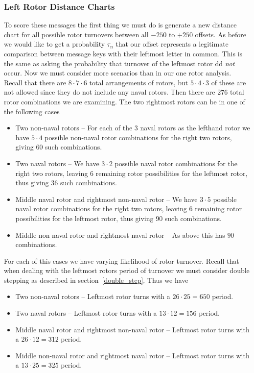   \subsubsection{Left Rotor Distance Charts}
  To score these messages the first thing we must do is generate a
  new distance chart for all possible rotor turnovers between all
  $-250$ to $+250$ offsets. As before we would like to get a
  probability $\tau_n$ that our offset represents a legitimate
  comparison between message keys with their leftmost letter in
  common. This is the same as asking the probability that turnover of
  the leftmost rotor dd \emph{not} occur. Now we must consider
  more scenarios than in our one rotor analysis. Recall that there
  are $8\cdot7\cdot6$ total arrangements of rotors, but
  $5\cdot4\cdot3$ of these are not allowed since they do not include
  any naval rotors. Then there are $276$ total rotor combinations we
  are examining. The two rightmost rotors can be in one of the following cases
  \begin{itemize}
    \item Two non-naval rotors -- For each of the $3$ naval rotors as
      the lefthand rotor we have $5\cdot4$ possible non-naval rotor
      combinations for the right two rotors, giving $60$ such combinations.
    \item Two naval rotors --  We have $3\cdot2$ possible naval rotor
      combinations for the right two rotors, leaving $6$ remaining
      rotor possibilities for the leftmost rotor, thus giving $36$
      such combinations.
    \item Middle naval rotor and rightmost non-naval rotor --  We
      have $3\cdot5$ possible naval rotor combinations for the right
      two rotors, leaving $6$ remaining rotor possibilities for the
      leftmost rotor, thus giving $90$ such combinations.
    \item Middle non-naval rotor and rightmost naval rotor --  As
      above this has $90$ combinations.
  \end{itemize}

  For each of this cases we have varying likelihood of rotor
  turnover. Recall that when dealing with the leftmost rotors period
  of turnover we must consider double stepping as described in
  section~\ref{double_step}. Thus we have

  \begin{itemize}
    \item Two non-naval rotors -- Leftmost rotor turns with a
      $26\cdot25 = 650$ period.
    \item Two naval rotors --  Leftmost rotor turns with a $13\cdot12
      = 156$ period.
    \item Middle naval rotor and rightmost non-naval rotor --
      Leftmost rotor turns with a $26\cdot12 = 312$ period.
    \item Middle non-naval rotor and rightmost naval rotor --
      Leftmost rotor turns with a $13\cdot25 = 325$ period.
  \end{itemize}

